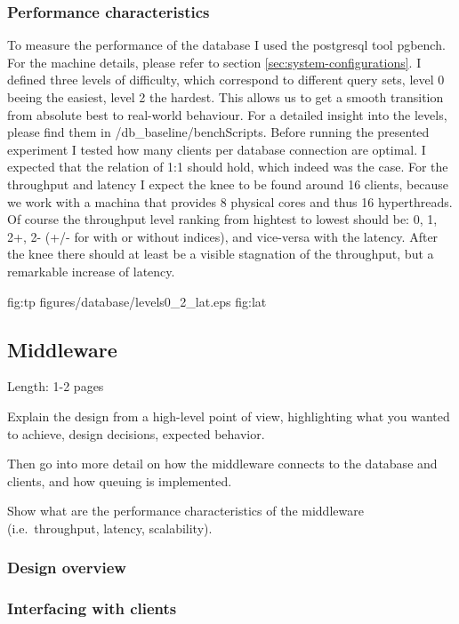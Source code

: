 \documentclass[11pt]{article}
\begin{document}
\subsubsection{Performance characteristics}\label{sec:performance-characteristics}
To measure the performance of the database I used the postgresql tool pgbench. For the machine details, please refer to section \ref{sec:system-configurations}. I defined three levels of difficulty, which correspond to different query sets, level 0 beeing the easiest, level 2 the hardest. This allows us to get a smooth transition from absolute best to real-world behaviour. For a detailed insight into the levels, please find them in /db\_baseline/benchScripts. Before running the presented experiment I tested how many clients per database connection are optimal. I expected that the relation of 1:1 should hold, which indeed was the case. For the throughput and latency I expect the knee to be found around 16 clients, because we work with a machina that provides 8 physical cores and thus 16 hyperthreads. Of course the throughput level ranking from hightest to lowest should be: 0, 1, 2+, 2- (+/- for with or without indices), and vice-versa with the latency. After the knee there should at least be a visible stagnation of the throughput, but a remarkable increase of latency.

 {} {fig:tp}
		{figures/database/levels0_2_lat.eps} {} {fig:lat}

\subsection{Middleware}\label{sec:middleware}

Length: 1-2 pages

Explain the design from a high-level point of view, highlighting what
you wanted to achieve, design decisions, expected behavior.

Then go into more detail on how the middleware connects to the database
and clients, and how queuing is implemented.

Show what are the performance characteristics of the middleware
(i.e.~throughput, latency, scalability).

\subsubsection{Design overview}\label{sec:design-overview}

\subsubsection{Interfacing with clients}\label{sec:interfacing-with-clients}
\end{document}
